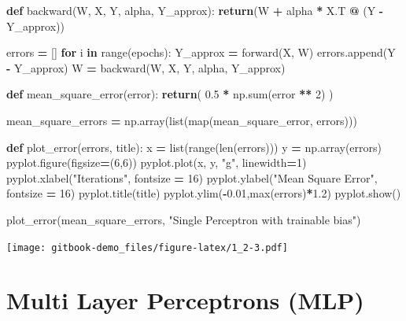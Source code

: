 \documentclass[
]{book}
\newenvironment{Shaded}{\begin{snugshade}}{\end{snugshade}}
\newcommand{\BuiltInTok}[1]{#1}
\newcommand{\ControlFlowTok}[1]{\textcolor[rgb]{0.13,0.29,0.53}{\textbf{#1}}}
\newcommand{\DecValTok}[1]{\textcolor[rgb]{0.00,0.00,0.81}{#1}}
\newcommand{\FloatTok}[1]{\textcolor[rgb]{0.00,0.00,0.81}{#1}}
\newcommand{\KeywordTok}[1]{\textcolor[rgb]{0.13,0.29,0.53}{\textbf{#1}}}
\newcommand{\NormalTok}[1]{#1}
\newcommand{\OperatorTok}[1]{\textcolor[rgb]{0.81,0.36,0.00}{\textbf{#1}}}
\newcommand{\StringTok}[1]{\textcolor[rgb]{0.31,0.60,0.02}{#1}}
\begin{document}
\begin{Shaded}
\begin{Highlighting}[]
\KeywordTok{def}\NormalTok{ backward(W, X, Y, alpha, Y\_approx):}
    \ControlFlowTok{return}\NormalTok{(W }\OperatorTok{+}\NormalTok{ alpha }\OperatorTok{*}\NormalTok{ X.T }\OperatorTok{@}\NormalTok{ (Y }\OperatorTok{{-}}\NormalTok{ Y\_approx))}
  
  
\NormalTok{errors }\OperatorTok{=}\NormalTok{ []}
\ControlFlowTok{for}\NormalTok{ i }\KeywordTok{in} \BuiltInTok{range}\NormalTok{(epochs):}
\NormalTok{  Y\_approx }\OperatorTok{=}\NormalTok{ forward(X, W)}
\NormalTok{  errors.append(Y }\OperatorTok{{-}}\NormalTok{ Y\_approx)}
\NormalTok{  W }\OperatorTok{=}\NormalTok{ backward(W, X, Y, alpha, Y\_approx)}
  
  
  
\KeywordTok{def}\NormalTok{ mean\_square\_error(error):}
  \ControlFlowTok{return}\NormalTok{( }\FloatTok{0.5} \OperatorTok{*}\NormalTok{ np.}\BuiltInTok{sum}\NormalTok{(error }\OperatorTok{**} \DecValTok{2}\NormalTok{) )}


\NormalTok{mean\_square\_errors }\OperatorTok{=}\NormalTok{ np.array(}\BuiltInTok{list}\NormalTok{(}\BuiltInTok{map}\NormalTok{(mean\_square\_error, errors)))}


\KeywordTok{def}\NormalTok{ plot\_error(errors, title):}
\NormalTok{  x }\OperatorTok{=} \BuiltInTok{list}\NormalTok{(}\BuiltInTok{range}\NormalTok{(}\BuiltInTok{len}\NormalTok{(errors)))}
\NormalTok{  y }\OperatorTok{=}\NormalTok{ np.array(errors)}
\NormalTok{  pyplot.figure(figsize}\OperatorTok{=}\NormalTok{(}\DecValTok{6}\NormalTok{,}\DecValTok{6}\NormalTok{))}
\NormalTok{  pyplot.plot(x, y, }\StringTok{"g"}\NormalTok{, linewidth}\OperatorTok{=}\DecValTok{1}\NormalTok{)}
\NormalTok{  pyplot.xlabel(}\StringTok{"Iterations"}\NormalTok{, fontsize }\OperatorTok{=} \DecValTok{16}\NormalTok{)}
\NormalTok{  pyplot.ylabel(}\StringTok{"Mean Square Error"}\NormalTok{, fontsize }\OperatorTok{=} \DecValTok{16}\NormalTok{)}
\NormalTok{  pyplot.title(title)}
\NormalTok{  pyplot.ylim(}\OperatorTok{{-}}\FloatTok{0.01}\NormalTok{,}\BuiltInTok{max}\NormalTok{(errors)}\OperatorTok{*}\FloatTok{1.2}\NormalTok{)}
\NormalTok{  pyplot.show()}
  
  
\NormalTok{plot\_error(mean\_square\_errors, }\StringTok{"Single Perceptron with trainable bias"}\NormalTok{)}
\end{Highlighting}
\end{Shaded}

\texttt{[image: gitbook-demo\_files/figure-latex/1\_2-3.pdf]}

\hypertarget{multi-layer-perceptrons-mlp}{%
\chapter{Multi Layer Perceptrons (MLP)}\label{multi-layer-perceptrons-mlp}}
\end{document}
